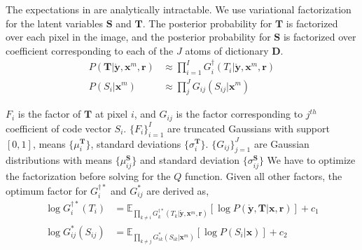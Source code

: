 The expectations in  are analytically intractable. We use variational factorization for the latent variables $\mathbf{S}$ and $\mathbf{T}$. The posterior probability for $\mathbf{T}$ is factorized over each pixel in the image, and the posterior probability for $\mathbf{S}$ is factorized over coefficient corresponding to each of the $J$ atoms of dictionary $\mathbf{D}$.
\begin{align}
P \left( \mathbf{T} | \mathbf{\mathring y}, \mathbf{x}^m, \mathbf{r} \right) &\approx \prod_{i=1}^{I} G^\dagger_i \left( T_i | \mathbf{\mathring y}, \mathbf{x}^m, \mathbf{r} \right) \label{eqn:vbFactT} \\
P \left( S_i | \mathbf{x}^m \right) &\approx \prod_{j}^{J} G_{ij} (S_{ij} | \mathbf{x}^m) \label{eqn:vbFactS}
\end{align}

$F_i$ is the factor of $\mathbf{T}$ at pixel $i$, and $G_{ij}$ is the factor corresponding to $j^{th}$ coefficient of code vector $S_i$. $\lbrace F_i \rbrace_{i=1}^{I}$ are truncated Gaussians with support $\left[0, 1 \right]$, means $\lbrace \mu^\mathbf{T}_i \rbrace$,  standard deviations $\lbrace \sigma^\mathbf{T}_i \rbrace$. $\lbrace G_{ij} \rbrace_{j=1}^{J}$ are Gaussian distributions with means $ \lbrace \mu^{\mathbf{S}}_{ij} \rbrace $ and standard deviation $ \lbrace \sigma^{\mathbf{S}}_{ij} \rbrace $ We have to optimize the factorization before solving for the $Q$ function. Given all other factors, the optimum factor for $G^{\dagger*}_i$ and $G^*_{ij}$ are derived as,
\begin{align}
\log G^{\dagger*}_i (T_i) &= \mathbb{E}_{ \prod_{k \neq i} G^{\dagger*}_k \left( T_k | \mathbf{\mathring y}, \mathbf{x}^m, \mathbf{r} \right) } \left[ \log P \left( \mathbf{\mathring y}, \mathbf{T} | \mathbf{x}, \mathbf{r} \right) \right] + c_1 \label{eqn:solveFactT} \\
\log G_{ij}^* \left( S_{ij} \right) &= \mathbb{E}_{ \prod_{k \neq j} G^*_{ik} \left( S_{ik} | \mathbf{x}^m \right) } \left[ \log P \left( S_i | \mathbf{x} \right)\right] + c_2 \label{eqn:solveFactS}
\end{align}

